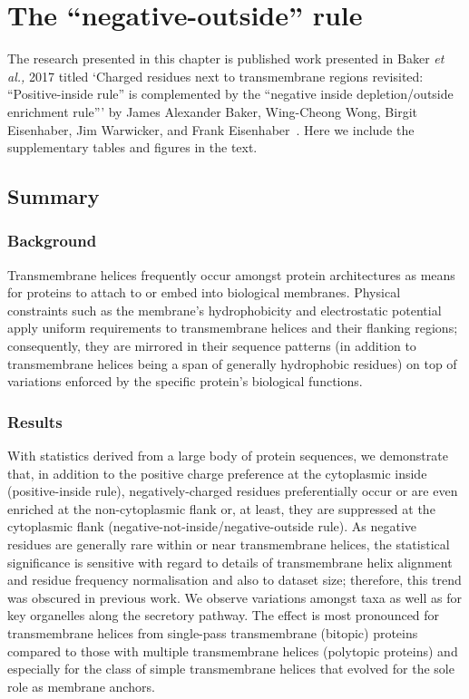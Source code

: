 \chapter{The ``negative-outside'' rule}
\sloppy

The research presented in this chapter is published work presented in Baker \textit{et al.,} 2017 titled `Charged residues next to transmembrane regions revisited: ``Positive\--inside rule'' is complemented by the ``negative inside depletion/outside enrichment rule''' by James Alexander Baker, Wing\--Cheong Wong, Birgit Eisenhaber, Jim Warwicker, and Frank Eisenhaber~\cite{Baker2017}.
Here we include the supplementary tables and figures in the text.

\section{Summary}

\subsection{Background}

Transmembrane helices frequently occur amongst protein architectures as means for proteins to attach to or embed into biological membranes.
Physical constraints such as the membrane’s hydrophobicity and electrostatic potential apply uniform requirements to transmembrane helices and their flanking regions; consequently, they are mirrored in their sequence patterns (in addition to transmembrane helices being a span of generally hydrophobic residues) on top of variations enforced by the specific protein’s biological functions.

\subsection{Results}

With statistics derived from a large body of protein sequences, we demonstrate that, in addition to the positive charge preference at the cytoplasmic inside (positive\--inside rule), negatively\--charged residues preferentially occur or are even enriched at the non\--cytoplasmic flank or, at least, they are suppressed at the cytoplasmic flank (negative\--not\--inside/negative\--outside rule).
As negative residues are generally rare within or near transmembrane helices, the statistical significance is sensitive with regard to details of transmembrane helix alignment and residue frequency normalisation and also to dataset size; therefore, this trend was obscured in previous work.
We observe variations amongst taxa as well as for key organelles along the secretory pathway.
The effect is most pronounced for transmembrane helices from single\--pass transmembrane (bitopic) proteins compared to those with multiple transmembrane helices (polytopic proteins) and especially for the class of simple transmembrane helices that evolved for the sole role as membrane anchors.

